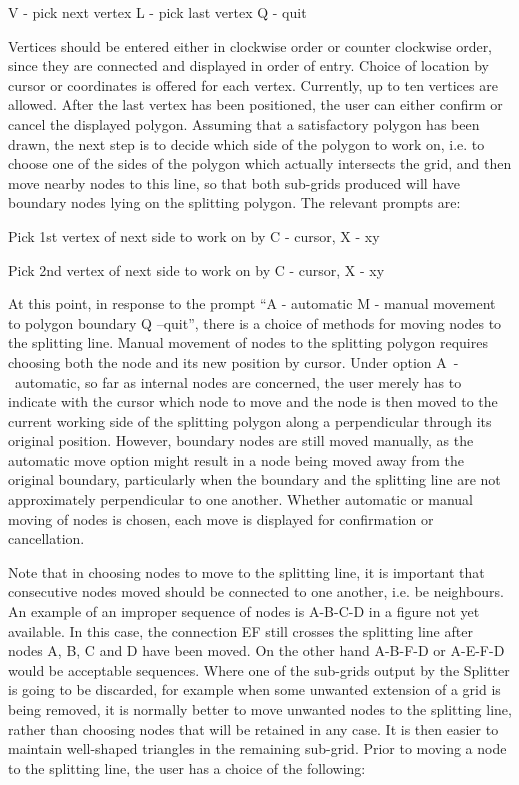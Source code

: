 \documentclass{article}
\begin{document}
V - pick next vertex L - pick last vertex Q - quit

Vertices should be entered either in clockwise order or counter clockwise order, since they are connected and displayed in order of entry. Choice of location by cursor or coordinates is offered for each vertex. Currently, up to ten vertices are allowed. After the last vertex has been positioned, the user can either confirm or cancel the displayed polygon. Assuming that a satisfactory polygon has been drawn, the next step is to decide which side of the polygon to work on, i.e. to choose one of the sides of the polygon which actually intersects the grid, and then move nearby nodes to this line, so that both sub-grids produced will have boundary nodes lying on the splitting polygon. The relevant prompts are:

Pick 1st vertex of next side to work on by C - cursor, X - xy

Pick 2nd vertex of next side to work on by C - cursor, X - xy

At this point, in response to the prompt ``A - automatic M - manual movement to polygon boundary Q --quit'', there is a choice of methods for moving nodes to the splitting line. Manual movement of nodes to the splitting polygon requires choosing both the node and its new position by cursor. Under option A~-~automatic, so far as internal nodes are concerned, the user merely has to indicate with the cursor which node to move and the node is then moved to the current working side of the splitting polygon along a perpendicular through its original position. However, boundary nodes are still moved manually, as the automatic move option might result in a node being moved away from the original boundary, particularly when the boundary and the splitting line are not approximately perpendicular to one another. Whether automatic or manual moving of nodes is chosen, each move is displayed for confirmation or cancellation.

Note that in choosing nodes to move to the splitting line, it is important that consecutive nodes moved should be connected to one another, i.e. be neighbours. An example of an improper sequence of nodes is A-B-C-D in a figure not yet available. In this case, the connection EF still crosses the splitting line after nodes A, B, C and D have been moved. On the other hand A-B-F-D or A-E-F-D would be acceptable sequences. Where one of the sub-grids output by the Splitter is going to be discarded, for example when some unwanted extension of a grid is being removed, it is normally better to move unwanted nodes to the splitting line, rather than choosing nodes that will be retained in any case. It is then easier to maintain well-shaped triangles in the remaining sub-grid. Prior to moving a node to the splitting line, the user has a choice of the following:
\end{document}
